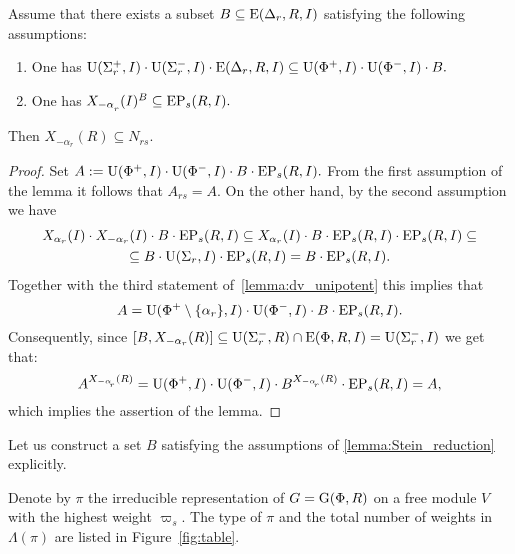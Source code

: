 
\begin{lemma}\label{lemma:Stein_reduction}
Assume that there exists a subset $B \subseteq \operatorname{E}(\Delta_r, R, I)$ satisfying the following assumptions:
\begin{enumerate}
 \item\label{stein_cond1} One has $\operatorname{U}(\Sigma^+_r, I)\cdot \operatorname{U}(\Sigma^-_r, I) \cdot \operatorname{E}(\Delta_r, R, I) \subseteq \operatorname{U}(\Phi^+, I)\cdot \operatorname{U}(\Phi^-, I) \cdot B.$
 \item\label{stein_cond2} One has $X_{-\alpha\ssub{r}}(I)^B \subseteq \EP_s(R, I).$
\end{enumerate}
Then $X_{-\alpha_r}(R) \subseteq N_{rs}.$
\end{lemma}
\begin{proof}
Set $A:=\operatorname{U}(\Phi^+, I)\cdot \operatorname{U}(\Phi^-, I) \cdot B \cdot \operatorname{EP}_s(R, I).$
From the first assumption of the lemma it follows that $A_{rs}=A$.
On the other hand, by the second assumption we have
\begin{multline*}
X_{\alpha_r}(I) \cdot X_{-\alpha_r}(I) \cdot B \cdot \operatorname{EP}_s(R, I) \subseteq 
X_{\alpha_r}(I) \cdot B \cdot \operatorname{EP}_s(R, I) \cdot \operatorname{EP}_s(R, I) \subseteq \\
\subseteq B \cdot \operatorname{U}(\Sigma_r, I) \cdot \operatorname{EP}_s(R, I) =
B \cdot \operatorname{EP}_s(R, I).
\end{multline*}
Together with the third statement of~\cref{lemma:dv_unipotent} this implies that
\begin{equation*} \label{rel:sred}
A = \operatorname{U}(\Phi^+\setminus\{\alpha_r\}, I) \cdot \operatorname{U}(\Phi^-, I) \cdot B \cdot \operatorname{EP}_s(R, I).
\end{equation*}
Consequently, since $[B, X_{-\alpha_r}(R)] \subseteq \operatorname{U}(\Sigma_r^-, R) \cap \operatorname{E}(\Phi, R, I) = \operatorname{U}(\Sigma_r^-, I)$ we get that:
\begin{equation*} \label{rel:ninv} A^{X_{-\alpha\ssub{r}}(R)} = \U(\Phi^+, I) \cdot \U(\Phi^-, I) \cdot B ^{X_{-\alpha\ssub{r}}(R)} \cdot \EP_s(R, I) = A, \end{equation*}
which implies the assertion of the lemma. \end{proof}

Let us construct a set $B$ satisfying the assumptions of \cref{lemma:Stein_reduction} explicitly.

Denote by $\pi$ the irreducible representation of $G=\operatorname{G}(\Phi, R)$ on a free module $V$ with the highest weight $\varpi_s$.
The type of $\pi$ and the total number of weights in $\Lambda(\pi)$ are listed in Figure~\ref{fig:table}.

